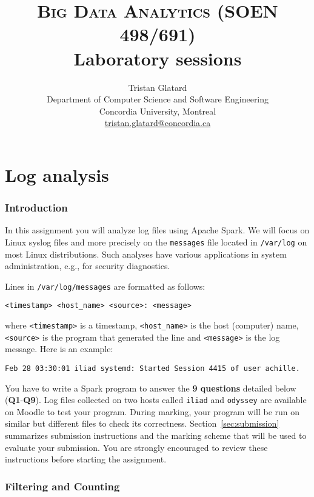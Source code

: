 \documentclass[11pt]{article}
\title{\textsc{Big Data Analytics (SOEN 498/691)} \\ Laboratory sessions}
\author{Tristan Glatard\\Department of Computer Science and Software Engineering\\Concordia University, Montreal\\\href{mailto:tristan.glatard@concordia.ca}{tristan.glatard@concordia.ca}}
\newcounter{ques}
\begin{document}
\maketitle

\newpage

\tableofcontents

\newpage

\part{Log analysis}

\section{Introduction}

In this assignment you will analyze log files using Apache
Spark. We will focus on Linux syslog files and more precisely on the
\texttt{messages} file located in \texttt{/var/log} on most Linux
distributions. Such analyses have various applications in system
administration, e.g., for security diagnostics.

Lines in \texttt{/var/log/messages} are formatted as follows:
\begin{center}
  \texttt{<timestamp> <host\_name> <source>: <message>}
\end{center}
where \texttt{<timestamp>} is a timestamp, \texttt{<host\_name>} is
the host (computer) name, \texttt{<source>} is the program that
generated the line and \texttt{<message>} is the log message. Here is
an example:
\begin{center}
  \texttt{Feb 28 03:30:01 iliad systemd: Started Session 4415 of user achille.}
\end{center}

You have to write a Spark program to answer the \textbf{9 questions}
detailed below (\textbf{Q1}-\textbf{Q9}). Log files collected on two
hosts called \texttt{iliad} and \texttt{odyssey} are available on
Moodle to test your program. During marking, your program will be run
on similar but different files to check its correctness.
Section~\ref{sec:submission} summarizes submission instructions and
the marking scheme that will be used to evaluate your submission. You
are strongly encouraged to review these instructions before starting
the assignment.

\section{Filtering and Counting}
\end{document}
